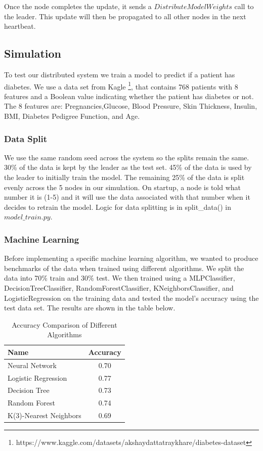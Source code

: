 \documentclass{article}
\begin{document}
Once the node completes the update, it sends a $DistributeModelWeights$ call to the leader. This update will then be propagated to all other nodes in the next heartbeat.

\subsection{Simulation}

To test our distributed system we train a model to predict if a patient has diabetes. We use a data set from Kagle \footnote{https://www.kaggle.com/datasets/akshaydattatraykhare/diabetes-dataset}, that contains 768 patients with 8 features and a Boolean value indicating whether the patient has diabetes or not. The 8 features are: Pregnancies,Glucose, Blood Pressure, Skin Thickness, Insulin, BMI,  Diabetes Pedigree Function, and Age.

\subsubsection{Data Split}
We use the same random seed across the system so the splits remain the same. 30\% of the data is kept by the leader as the test set. 45\% of the data is used by the leader to initially train the model. The remaining 25\% of the data is split evenly across the 5 nodes in our simulation. On startup, a node is told what number it is (1-5) and it will use the data associated with that number when it decides to retrain the model. Logic for data splitting is in split\_data() in $model\_train.py$.  

\subsubsection{Machine Learning}
Before implementing a specific machine learning algorithm, we wanted to produce benchmarks of the data when trained using different algorithms. We split the data into 70\% train and 30\% test. We then trained using a MLPClassifier, DecisionTreeClassifier, RandomForestClassifier, KNeighborsClassifier, and LogisticRegression on the training data and tested the model's accuracy using the test data set. The results are shown in the table below.
 
\begin{table}[h]
    \centering
    \begin{tabular}{|l|c|}
    \hline
    \textbf{Name} & \textbf{Accuracy} \\ \hline
    Neural Network & 0.70 \\ \hline
    Logistic Regression & 0.77 \\ \hline
    Decision Tree & 0.73 \\ \hline
    Random Forest & 0.74\\ \hline
    K(3)-Nearest Neighbors & 0.69 \\ \hline
    \end{tabular}
    \caption{Accuracy Comparison of Different Algorithms}

    \label{tab:accuracy_comparison}
\end{table}
\end{document}
